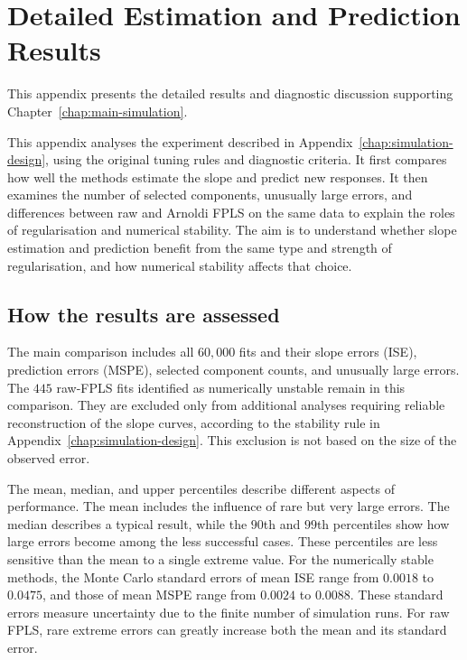\chapter{Detailed Estimation and Prediction Results}
\label{chap:estimation-results}

This appendix presents the detailed results and diagnostic discussion supporting
Chapter~\ref{chap:main-simulation}.

This appendix analyses the experiment described in
Appendix~\ref{chap:simulation-design}, using the original tuning rules and
diagnostic criteria. It first compares how well the methods estimate the slope
and predict new responses. It then examines the number of selected components,
unusually large errors, and differences between raw and Arnoldi FPLS on the
same data to explain the roles of regularisation and numerical stability. The
aim is to understand whether slope estimation and prediction benefit from the
same type and strength of regularisation, and how numerical stability affects
that choice.

\section{How the results are assessed}
\label{sec:results-verification}

The main comparison includes all $60{,}000$ fits and their slope errors (ISE),
prediction errors (MSPE), selected component counts, and unusually large
errors. The $445$ raw-FPLS fits identified as numerically unstable remain in
this comparison. They are excluded only from additional analyses requiring
reliable reconstruction of the slope curves, according to the stability rule
in Appendix~\ref{chap:simulation-design}. This exclusion is not based on the
size of the observed error.

The mean, median, and upper percentiles describe different aspects of
performance. The mean includes the influence of rare but very large errors.
The median describes a typical result, while the $90$th and $99$th percentiles
show how large errors become among the less successful cases. These
percentiles are less sensitive than the mean to a single extreme value.
For the numerically stable methods, the Monte Carlo standard errors of mean
ISE range from $0.0018$ to $0.0475$, and those of mean MSPE range from
$0.0024$ to $0.0088$. These standard errors measure uncertainty due to the
finite number of simulation runs. For raw FPLS, rare extreme errors can
greatly increase both the mean and its standard error.

